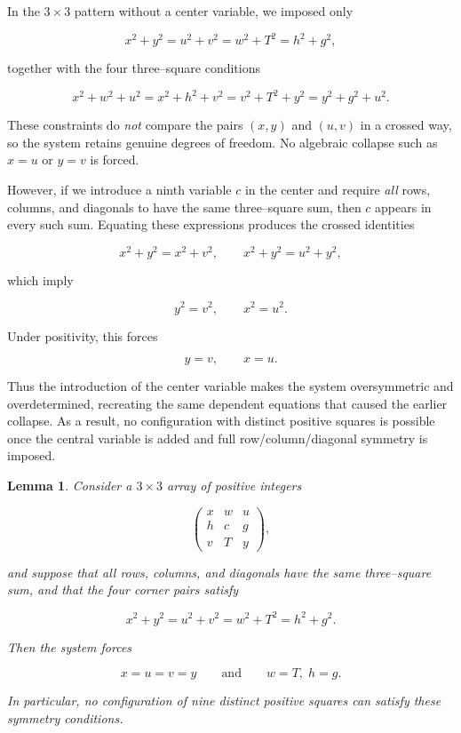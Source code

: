 \documentclass[12pt]{article}
\newtheorem{lemma}{Lemma}
\begin{document}
In the $3\times 3$ pattern without a center variable, we imposed only


\[
x^{2}+y^{2}=u^{2}+v^{2}=w^{2}+T^{2}=h^{2}+g^{2},
\]


together with the four three–square conditions


\[
x^{2}+w^{2}+u^{2}
= x^{2}+h^{2}+v^{2}
= v^{2}+T^{2}+y^{2}
= y^{2}+g^{2}+u^{2}.
\]


These constraints do \emph{not} compare the pairs $(x,y)$ and $(u,v)$ in a crossed way, so the system retains genuine degrees of freedom. No algebraic collapse such as $x=u$ or $y=v$ is forced.

\medskip

However, if we introduce a ninth variable $c$ in the center and require
\emph{all} rows, columns, and diagonals to have the same three–square sum, then $c$ appears in every such sum. Equating these expressions produces the crossed identities


\[
x^{2}+y^{2}=x^{2}+v^{2}, \qquad
x^{2}+y^{2}=u^{2}+y^{2},
\]


which imply


\[
y^{2}=v^{2}, \qquad x^{2}=u^{2}.
\]


Under positivity, this forces


\[
y=v, \qquad x=u.
\]



Thus the introduction of the center variable makes the system over\-symmetric and over\-determined, recreating the same dependent equations that caused the earlier collapse. As a result, no configuration with distinct positive squares is possible once the central variable is added and full row/column/diagonal symmetry is imposed.

\begin{lemma}
Consider a $3\times 3$ array of positive integers


\[
\begin{pmatrix}
x & w & u\\[4pt]
h & c & g\\[4pt]
v & T & y
\end{pmatrix},
\]


and suppose that all rows, columns, and diagonals have the same three--square sum, and that the four corner pairs satisfy


\[
x^{2}+y^{2}
= u^{2}+v^{2}
= w^{2}+T^{2}
= h^{2}+g^{2}.
\]


Then the system forces


\[
x=u=v=y
\qquad\text{and}\qquad
w=T,\; h=g.
\]


In particular, no configuration of nine distinct positive squares can satisfy these symmetry conditions.
\end{lemma}
\end{document}

